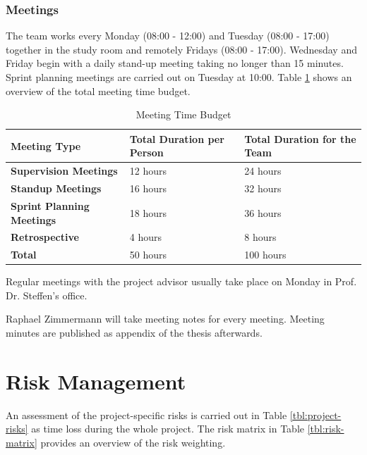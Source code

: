 \subsection{Meetings}
The team works every Monday (08:00 - 12:00) and Tuesday (08:00 - 17:00) together in the study room and remotely Fridays (08:00 - 17:00). Wednesday and Friday begin with a daily stand-up meeting taking no longer than 15 minutes. Sprint planning meetings are carried out on Tuesday at 10:00. Table \ref{meeting-time-budget} shows an overview of the total meeting time budget.

\begin{table}[]
    \centering
    \caption{Meeting Time Budget}
    \label{meeting-time-budget}
    \begin{tabular}{lll}
        \hline
        \textbf{Meeting Type}             & \textbf{Total Duration per Person} & \textbf{Total Duration for the Team} \\ \hline
        \textbf{Supervision Meetings}     & 12 hours                           & 24 hours                             \\
        \textbf{Standup Meetings}         & 16 hours                            & 32 hours                             \\
        \textbf{Sprint Planning Meetings} & 18 hours                           & 36 hours                             \\
        \textbf{Retrospective}            & 4 hours                            & 8 hours                              \\ \hline
        \textbf{Total}                    & 50 hours                           & 100 hours
    \end{tabular}
\end{table}

Regular meetings with the project advisor usually take place on Monday in Prof. Dr. Steffen's office.

Raphael Zimmermann will take meeting notes for every meeting. Meeting minutes are published as appendix of the thesis afterwards.

\chapter{Risk Management}
An assessment of the project-specific risks is carried out in Table \ref{tbl:project-risks} as time loss during the whole project. The risk matrix in Table \ref{tbl:risk-matrix} provides an overview of the risk weighting.


